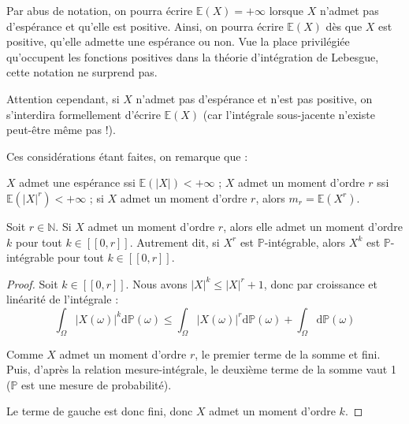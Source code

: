 \documentclass[../integ-proba.tex]{subfiles}
\begin{document}
    \begin{rem}
        Par abus de notation, on pourra écrire $\mathbb{E}(X)=+\infty$ lorsque $X$ n'admet pas d'espérance et qu'elle est positive.
        Ainsi, on pourra écrire $\mathbb{E}(X)$ dès que $X$ est positive, qu'elle admette une espérance ou non.
        Vue la place privilégiée qu'occupent les fonctions positives dans la théorie d'intégration de Lebesgue, cette notation ne surprend pas.

        Attention cependant, si $X$ n'admet pas d'espérance et n'est pas positive, on s'interdira formellement d'écrire $\mathbb{E}(X)$ (car l'intégrale sous-jacente n'existe peut-être même pas !).
    \end{rem}

    \begin{rem}
        Ces considérations étant faites, on remarque que :
        \begin{itemize}
            \itemb $X$ admet une espérance ssi $\mathbb{E}(\left| X \right|) < +\infty$ ;
            \itemb $X$ admet un moment d'ordre $r$ ssi $\mathbb{E}(\left| X \right|^r) < +\infty$ ;
            \itemb si $X$ admet un moment d'ordre $r$, alors $m_r = \mathbb{E}(X^r)$.
        \end{itemize}
    \end{rem}

    \begin{prop}
        \label{prop:moments_cascade}
        Soit $r\in\mathbb{N}$.
        Si $X$ admet un moment d'ordre $r$, alors elle admet un moment d'ordre $k$ pour tout $k\in[\![0,r]\!]$.
        Autrement dit, si $X^r$ est $\mathbb{P}$-intégrable, alors $X^k$ est $\mathbb{P}$-intégrable pour tout $k\in[\![0,r]\!]$.
    \end{prop}

    \begin{proof}
        Soit $k\in[\![0,r]\!]$.
        Nous avons $\left|X\right|^k \leq \left|X\right|^r+1$, donc par croissance et linéarité de l'intégrale :
        \begin{displaymath}
            \int_\Omega \left|X(\omega)\right|^k \text{d}\mathbb{P}(\omega) \leq \int_\Omega \left|X(\omega)\right|^r \text{d}\mathbb{P}(\omega) + \int_\Omega \text{d}\mathbb{P}(\omega)
        \end{displaymath}

        Comme $X$ admet un moment d'ordre $r$, le premier terme de la somme et fini.
        Puis, d'après la relation mesure-intégrale, le deuxième terme de la somme vaut 1 ($\mathbb{P}$ est une mesure de probabilité).

        Le terme de gauche est donc fini, donc $X$ admet un moment d'ordre $k$.
    \end{proof}
\end{document}

